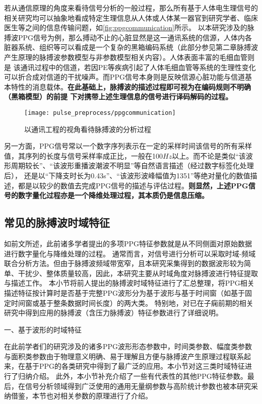 若从通信原理的角度来看待信号分析的一般过程，那么所有基于人体电生理信号的相关研究均可以抽象地看成特定生理信息从人体或人体某一器官到研究学者、临床医生等之间的信息传输问题，如\autoref{fig:ppgcommunication}所示。
以本研究涉及的脉搏波PPG信号为例，那么搏动不止的心脏显然是这一通讯系统的信源，人体内各脏器系统、组织等可以看成是一个复杂的黑箱编码系统（此部分参见第二章脉搏波产生原理的脉搏波参数模型与非参数模型相关内容）。人体表面丰富的毛细血管则是
该通讯过程中的信道，若因PE等疾病引起了人体毛细血管等系统的生理性变化可以折合成对信道的干扰噪声。而PPG信号本身则是反映信源心脏功能与信道基本特性的消息载体。\textbf{在此基础上，脉搏波的描述过程即可视为在编码规则不明确（黑箱模型）的前提
下对携带上述生理信息的信号进行译码解码的过程。}
\begin{figure}[htbp]
    \centering
    \texttt{[image: pulse\_preprocess/ppgcommunication]}
    \caption{\label{fig:ppgcommunication}以通讯工程的视角看待脉搏波的分析过程}
\end{figure}

另一方面，PPG信号常以一个数字序列表示在一定的采样时间该信号的所有采样值，其序列的长度与信号采样率成正比，一般在100$Hz$以上。而不论是类似“该波形周期较长”、“该波形重播波潮波不明显”等自然语言描述（经过数字标签化处理后），
还是以“下降支时长为0.43s”、“该波形波峰幅值为1351”等绝对量化的数值描述，都是以较少的数值去完成PPG信号的描述与评估过程。\textbf{则显然，上述PPG信号的数字量化过程亦是一个降维处理过程，其本质仍是信息压缩。}

\subsection{常见的脉搏波时域特征}
如前文所述，此前诸多学者提出的多项PPG特征参数就是从不同侧面对原始数据进行数字量化与降维处理的过程。
通常而言，对信号进行分析可以采取时域-频域联合分析方法。但由于脉搏波频域带宽窄，且本研究采集得到的数据波形较为简单、干扰少、整体质量较高，因此，本研究主要从时域角度对脉搏波进行特征提取与描述工作。
本小节将前人提出的脉搏波时域特征进行了汇总整理，将PPG相关描述特征按计算时是否基于完整PPG波形分为基于波形与基于时间窗（如基于固定时间窗或基于整条数据时间长度）的两大类。
特别地，对已在子痫前期的相关研究中得到应用的脉搏波（含压力脉搏波）特征参数进行了详细说明。

一、基于波形的时域特征

在此前学者们的研究涉及的诸多PPG波形形态参数中，时间类参数、幅度类参数与面积类参数由于物理意义明确、易于理解且方便与脉搏波产生原理过程联系起来，在基于PPG的各类研究中得到了最广泛的应用\cite{cwl,mmt}。本小节对这三类时域特征进行了归纳介绍。
此外，本小节补充介绍了一些有代表性的其他PPG特征参数。最后，在信号分析领域得到广泛使用的通用无量纲参数与高阶统计参数也被本研究采纳借鉴，本节也对相关参数的原理进行了介绍。

